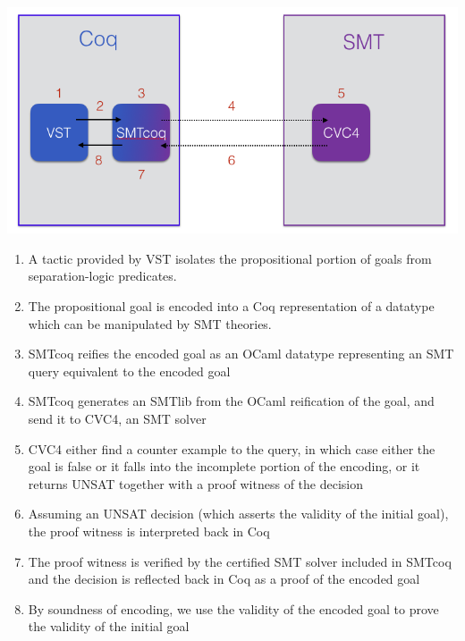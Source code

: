 \documentclass[onecolumn, preprint]{sigplanconf}
\begin{document}
\includegraphics[scale=0.5]{pictures/arch.png}



\begin{enumerate}
\item %
  A tactic provided by VST isolates the propositional portion of goals from separation-logic predicates.
\item %
  The propositional goal is encoded into a Coq representation of a datatype which can be manipulated by SMT theories.
  
\item %
 SMTcoq reifies the encoded goal as an OCaml datatype representing an SMT query equivalent to the encoded goal
  
\item %
  SMTcoq generates an SMTlib from the OCaml reification of the goal, and send it to CVC4, an SMT solver
  
\item %
  CVC4 either find a counter example to the query, in which case either the goal is false or it falls into the incomplete portion of the encoding, or it returns UNSAT together with a proof witness of the decision
  
\item %
  Assuming an UNSAT decision (which asserts the validity of the initial goal), the proof witness is interpreted back in Coq 
  
  
\item %
  The proof witness is verified by the certified SMT solver included in SMTcoq and the decision is reflected back in Coq as a proof of the encoded goal
  
\item %
  By soundness of encoding, we use the validity of the encoded goal to prove the validity of the initial goal

  
\end{enumerate}
\end{document}
